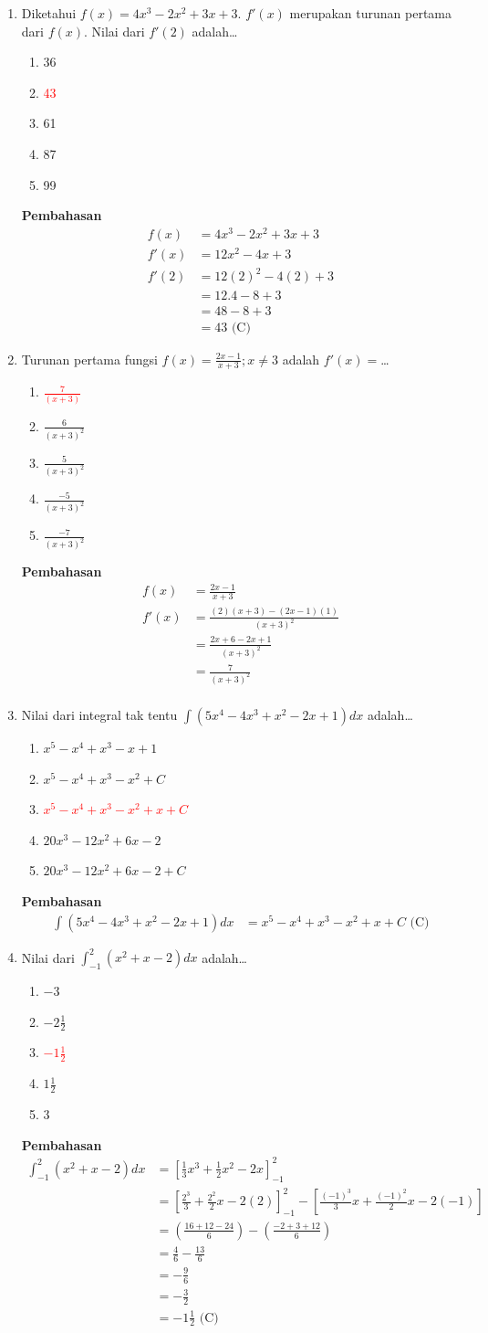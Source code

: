 \documentclass{report}
\newcommand{\options}[5]{
\begin{enumerate}[label=\alph*.]
	\item #1
	\item #2
	\item #3
	\item #4
	\item #5
\end{enumerate}
}
\newcommand{\pemb}{ \textbf{Pembahasan} \\}
\begin{document}
\begin{enumerate}
\item Diketahui $f(x)=4x^3-2x^2+3x+3$. $f'(x)$  merupakan turunan pertama dari $f(x)$. Nilai dari $f'(2)$ adalah\ldots
\options
{36}
{\textcolor{red}{43}}
{61}
{87}
{99}
\pemb
\begin{align*}
	f(x) &= 4x^3-2x^2+3x+3 \\
	f'(x) &= 12x^2-4x+3 \\
	f'(2) &= 12(2)^2-4(2)+3 \\
	      &= 12.4-8+3 \\
	      &= 48-8+3\\
	      &= 43 \text{ (C)}
\end{align*}

\item Turunan pertama fungsi $f(x)=\frac{2x-1}{x+3};x\neq3$ adalah $f'(x)=$\ldots
\options
{\textcolor{red}{$\frac{7}{\left(x+3\right)}$}}
{$\frac{6}{\left(x+3\right)^2}$}
{$\frac{5}{\left(x+3\right)^2}$}
{$\frac{-5}{\left(x+3\right)^2}$}
{$\frac{-7}{\left(x+3\right)^2}$}
\pemb
\begin{align*}
	f(x) &= \frac{2x-1}{x+3} \\
	f'(x) &= \frac{(2)(x+3) - (2x-1)(1)}{(x+3)^2} \\
             &= \frac{2x+6 - 2x+1}{(x+3)^2} \\
             &= \frac{7}{(x+3)^2} \\
\end{align*}

\item Nilai dari integral tak tentu $\int(5x^4-4x^3+x^2-2x+1)dx$ adalah\ldots
\options
{$x^5-x^4+x^3-x+1$}
{$x^5-x^4+x^3-x^2+C$}
{\textcolor{red}{$x^5-x^4+x^3-x^2+x+C$}}
{$20x^3-12x^2+6x-2$}
{$20x^3-12x^2+6x-2+C$}
\pemb
\begin{align*}
	\int(5x^4-4x^3+x^2-2x+1)dx &= x^5-x^4+x^3-x^2+x+C \text{ (C)}
\end{align*}

\item Nilai dari $\int_{-1}^2\left(x^2+x-2\right)dx$ adalah\ldots
\options
{$-3$}
{$-2\frac{1}{2}$}
{\textcolor{red}{$-1\frac{1}{2}$}}
{$1\frac{1}{2}$}
{$3$}
\pemb
\begin{align*}
	\int_{-1}^2\left(x^2+x-2\right)dx 
	&= \left[\frac{1}{3}x^3+\frac{1}{2}x^2-2x\right]_{-1}^2 \\
	&= \left[\frac{2^3}{3}+\frac{2^2}{2}x-2(2)\right]_{-1}^2 - \left[\frac{(-1)^3}{3}x+\frac{(-1)^2}{2}x-2(-1)\right] \\
	&= \left(\frac{16+12-24}{6}\right) - \left(\frac{-2+3+12}{6}\right) \\
	&= \frac{4}{6} - \frac{13}{6} \\
	&= -\frac{9}{6} \\
	&= -\frac{3}{2} \\
	&= -1\frac{1}{2} \text{ (C)}
\end{align*}


\end{enumerate}
\end{document}
